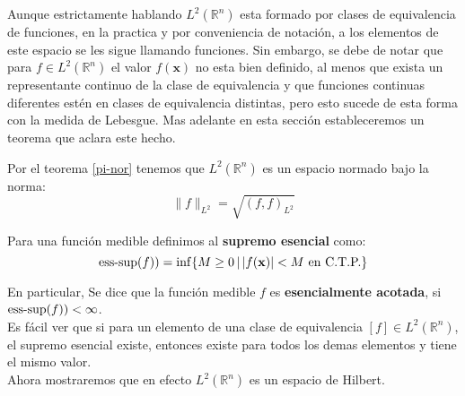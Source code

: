 \documentclass[12pt]{book}
\numberwithin{equation}{chapter}
\def\R{\mathbb{R}}
\def\x{\mathbf{x}}
\begin{document}
\vspace{5 mm}

Aunque estrictamente hablando $L^{2}(\R^{n})$ esta formado por clases de equivalencia de funciones, en la practica y por conveniencia de notaci\'on, a los elementos de este espacio se les sigue llamando funciones. Sin embargo, se debe de notar que para $ f \in L^{2}(\R^{n}) $ el valor $f(\x)$ no esta bien definido, al menos que exista un representante continuo de la clase de equivalencia y que funciones continuas diferentes est\'en en clases de equivalencia distintas, pero esto sucede de esta forma con la medida de Lebesgue. Mas adelante en esta secci\'on estableceremos un teorema que aclara este hecho.

\vspace{5 mm}

Por el teorema \ref{pi-nor} tenemos que $L^{2} (\R^{n})$ es un espacio normado bajo la norma:
$$ \| f \|_{L^{2}}= \sqrt{(f,f)_{L^{2}}} $$

Para una funci\'on medible definimos al {\bf supremo esencial} como:
$$ \hbox{ess-sup}(f) ) = \inf \{ M \geq 0 \,|\, |f(\x)| < M \hbox{ en C.T.P.}  \} $$

En particular, Se dice que la funci\'on medible $f$ es {\bf esencialmente acotada}, si $ \hbox{ess-sup}(f) ) < \infty$.\\
Es f\'acil ver que si para un elemento de una clase de equivalencia $[f] \in L^{2} (\R^{n}) $, el supremo esencial existe, entonces existe para todos los demas elementos y tiene el mismo valor.\\

Ahora mostraremos que en efecto $L^{2}(\R^{n})$ es un espacio de Hilbert.

\vspace{5 mm}
\end{document}
